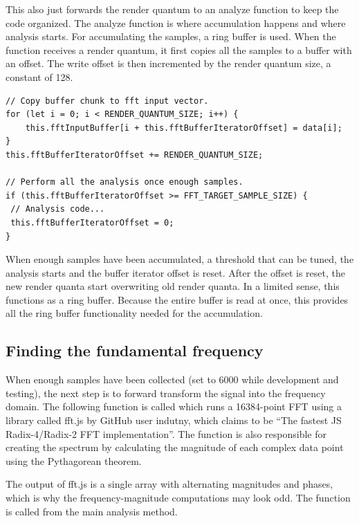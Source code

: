 

This also just forwards the render quantum to an analyze function to keep the code organized. The analyze function is where accumulation happens and where analysis starts. For accumulating the samples, a ring buffer is used. When the function receives a render quantum, it first copies all the samples to a buffer with an offset. The write offset is then incremented by the render quantum size, a constant of 128.

\begin{lstlisting}[style=javascript]
// Copy buffer chunk to fft input vector.
for (let i = 0; i < RENDER_QUANTUM_SIZE; i++) {
    this.fftInputBuffer[i + this.fftBufferIteratorOffset] = data[i];
}
this.fftBufferIteratorOffset += RENDER_QUANTUM_SIZE;

// Perform all the analysis once enough samples.
if (this.fftBufferIteratorOffset >= FFT_TARGET_SAMPLE_SIZE) {
 // Analysis code...
 this.fftBufferIteratorOffset = 0;
}
\end{lstlisting}
When enough samples have been accumulated, a threshold that can be tuned, the analysis starts and the buffer iterator offset is reset. After the offset is reset, the new render quanta start overwriting old render quanta. In a limited sense, this functions as a ring buffer. Because the entire buffer is read at once, this provides all the ring buffer functionality needed for the accumulation. 

\subsection{Finding the fundamental frequency}
When enough samples have been collected (set to 6000 while development and testing), the next step is to forward transform the signal into the frequency domain. The following function is called which runs a 16384-point FFT using a library called fft.js by GitHub user indutny, which claims to be “The fastest JS Radix-4/Radix-2 FFT implementation”. The function is also responsible for creating the spectrum by calculating the magnitude of each complex data point using the Pythagorean theorem. 



The output of fft.js is a single array with alternating magnitudes and phases, which is why the frequency-magnitude computations may look odd. The function is called from the main analysis method.

